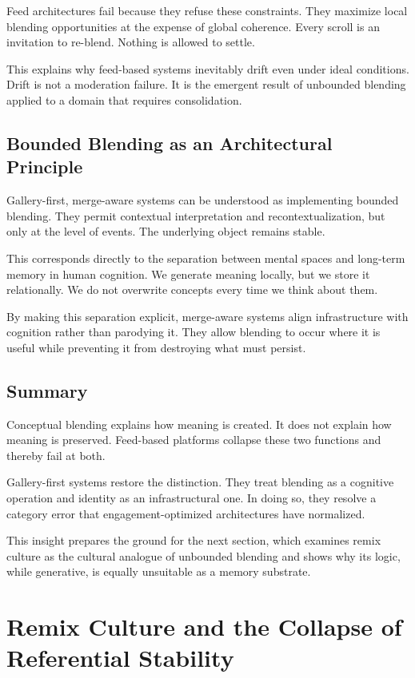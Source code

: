 \documentclass[11pt,oneside]{article}
\begin{document}
Feed architectures fail because they refuse these constraints. They maximize local blending opportunities at the expense of global coherence. Every scroll is an invitation to re-blend. Nothing is allowed to settle.

This explains why feed-based systems inevitably drift even under ideal conditions. Drift is not a moderation failure. It is the emergent result of unbounded blending applied to a domain that requires consolidation.

\subsection{Bounded Blending as an Architectural Principle}

Gallery-first, merge-aware systems can be understood as implementing bounded blending. They permit contextual interpretation and recontextualization, but only at the level of events. The underlying object remains stable.

This corresponds directly to the separation between mental spaces and long-term memory in human cognition. We generate meaning locally, but we store it relationally. We do not overwrite concepts every time we think about them.

By making this separation explicit, merge-aware systems align infrastructure with cognition rather than parodying it. They allow blending to occur where it is useful while preventing it from destroying what must persist.

\subsection{Summary}

Conceptual blending explains how meaning is created. It does not explain how meaning is preserved. Feed-based platforms collapse these two functions and thereby fail at both.

Gallery-first systems restore the distinction. They treat blending as a cognitive operation and identity as an infrastructural one. In doing so, they resolve a category error that engagement-optimized architectures have normalized.

This insight prepares the ground for the next section, which examines remix culture as the cultural analogue of unbounded blending and shows why its logic, while generative, is equally unsuitable as a memory substrate.

\section{Remix Culture and the Collapse of Referential Stability}
\end{document}
